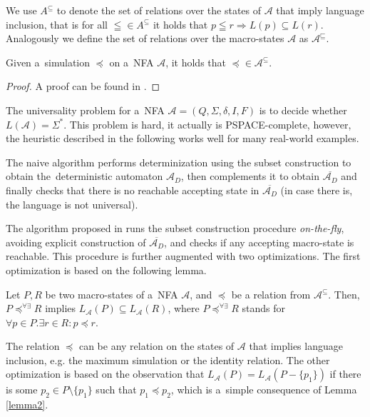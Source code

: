 We use $A^{\subseteq}$ to denote the set of relations over the states of
$\mathcal{A}$ that imply language inclusion, that is for all $\leqq \in
A^{\subseteq}$ it holds that $p \leqq r \Rightarrow L(p) \subseteq L(r)$.
Analogously we define the set of relations over the macro-states $\mathcal{A}$
as $\mathcal{A}^\sqsubseteq$.

\begin{lemma}
Given a~simulation $\preceq$ on a~NFA $\mathcal{A}$, it holds that $\preceq \in
\mathcal{A}^\subseteq$.
\end{lemma}

\begin{proof}
A proof can be found in \cite{tacas}.
\end{proof}

The universality problem for a~NFA $\mathcal{A} = (Q, \Sigma, \delta, I, F)$ is
to decide whether $L(\mathcal{A}) = \Sigma^*$. This problem is hard, it actually
is PSPACE-complete, however, the heuristic described in the following works well
for many real-world examples.

The naive algorithm performs determinization using the subset construction to
obtain the~deterministic automaton $\mathcal{A}_D$, then complements it to
obtain $\overline{\mathcal{A}_D}$ and finally checks that there is no reachable
accepting state in $\overline{\mathcal{A}_D}$ (in case there is, the language
is not universal).

The algorithm proposed in \cite{tacas} runs the subset construction procedure
\emph{on-the-fly}, avoiding explicit construction of $\overline{\mathcal{A}_D}$,
and checks if any accepting macro-state is reachable. This procedure is
further augmented with two optimizations.
\newpage
The first optimization is based on the following lemma.

\begin{lemma}\label{lemma2}
 Let $P, R$ be two macro-states of a~NFA $\mathcal{A}$, and $\preceq$ be a
 relation from $\mathcal{A}^\subseteq$. Then, $P \preceq^{\forall\exists} R$
 implies $L_\mathcal{A}(P) \subseteq L_\mathcal{A}(R)$, where $P
 \preceq^{\forall\exists} R$ stands for $\forall p \in P. \exists r\in R : p
 \preceq r$.
\end{lemma}

The relation $\preceq$ can be any relation on the states of $\mathcal{A}$ that
implies language inclusion, e.g. the maximum simulation or the identity
relation. The other optimization is based on the observation that
$L_\mathcal{A}(P) = L_\mathcal{A}(P - \{p_1\})$ if there is some $p_2 \in P \setminus \{p_1\}$ such
that $p_1 \preceq p_2$, which is a~simple consequence of Lemma \ref{lemma2}.

